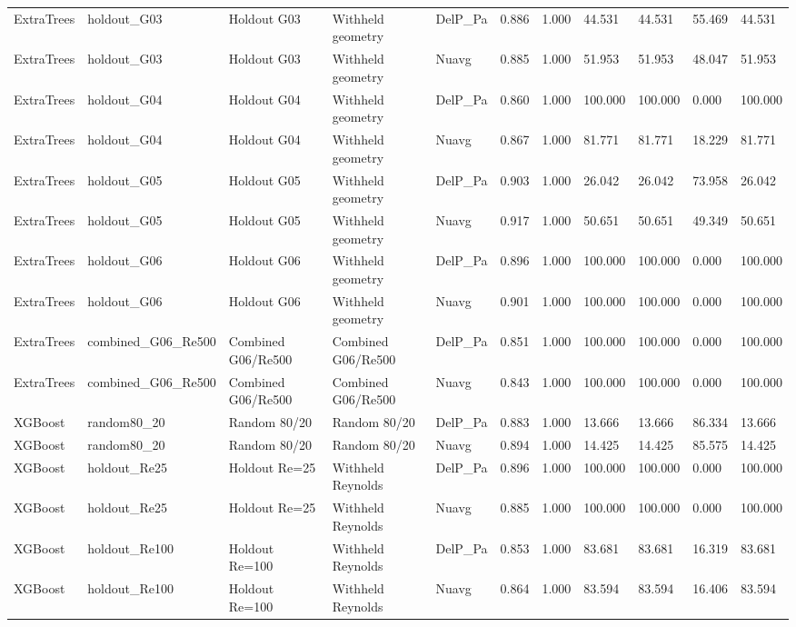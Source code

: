 \begin{tabular}{lllllllllll}
ExtraTrees & holdout_G03 & Holdout G03 & Withheld geometry & DelP_Pa & 0.886 & 1.000 & 44.531 & 44.531 & 55.469 & 44.531 \\
ExtraTrees & holdout_G03 & Holdout G03 & Withheld geometry & Nuavg & 0.885 & 1.000 & 51.953 & 51.953 & 48.047 & 51.953 \\
ExtraTrees & holdout_G04 & Holdout G04 & Withheld geometry & DelP_Pa & 0.860 & 1.000 & 100.000 & 100.000 & 0.000 & 100.000 \\
ExtraTrees & holdout_G04 & Holdout G04 & Withheld geometry & Nuavg & 0.867 & 1.000 & 81.771 & 81.771 & 18.229 & 81.771 \\
ExtraTrees & holdout_G05 & Holdout G05 & Withheld geometry & DelP_Pa & 0.903 & 1.000 & 26.042 & 26.042 & 73.958 & 26.042 \\
ExtraTrees & holdout_G05 & Holdout G05 & Withheld geometry & Nuavg & 0.917 & 1.000 & 50.651 & 50.651 & 49.349 & 50.651 \\
ExtraTrees & holdout_G06 & Holdout G06 & Withheld geometry & DelP_Pa & 0.896 & 1.000 & 100.000 & 100.000 & 0.000 & 100.000 \\
ExtraTrees & holdout_G06 & Holdout G06 & Withheld geometry & Nuavg & 0.901 & 1.000 & 100.000 & 100.000 & 0.000 & 100.000 \\
ExtraTrees & combined_G06_Re500 & Combined G06/Re500 & Combined G06/Re500 & DelP_Pa & 0.851 & 1.000 & 100.000 & 100.000 & 0.000 & 100.000 \\
ExtraTrees & combined_G06_Re500 & Combined G06/Re500 & Combined G06/Re500 & Nuavg & 0.843 & 1.000 & 100.000 & 100.000 & 0.000 & 100.000 \\
XGBoost & random80_20 & Random 80/20 & Random 80/20 & DelP_Pa & 0.883 & 1.000 & 13.666 & 13.666 & 86.334 & 13.666 \\
XGBoost & random80_20 & Random 80/20 & Random 80/20 & Nuavg & 0.894 & 1.000 & 14.425 & 14.425 & 85.575 & 14.425 \\
XGBoost & holdout_Re25 & Holdout Re=25 & Withheld Reynolds & DelP_Pa & 0.896 & 1.000 & 100.000 & 100.000 & 0.000 & 100.000 \\
XGBoost & holdout_Re25 & Holdout Re=25 & Withheld Reynolds & Nuavg & 0.885 & 1.000 & 100.000 & 100.000 & 0.000 & 100.000 \\
XGBoost & holdout_Re100 & Holdout Re=100 & Withheld Reynolds & DelP_Pa & 0.853 & 1.000 & 83.681 & 83.681 & 16.319 & 83.681 \\
XGBoost & holdout_Re100 & Holdout Re=100 & Withheld Reynolds & Nuavg & 0.864 & 1.000 & 83.594 & 83.594 & 16.406 & 83.594 \\

\end{tabular}
